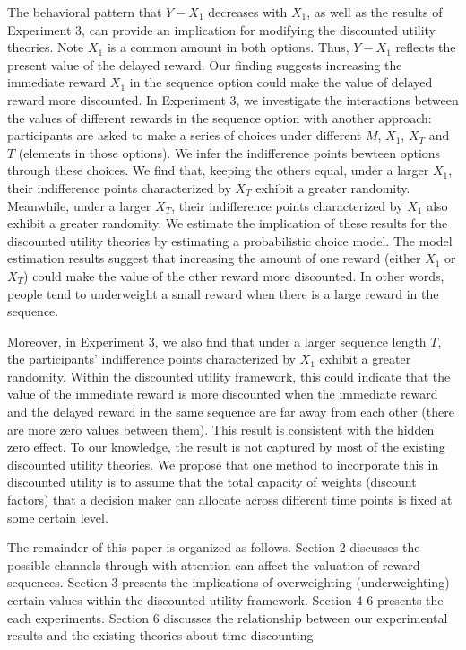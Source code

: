 \documentclass[
  12pt,
]{article}
\begin{document}
The behavioral pattern that \(Y-X_1\) decreases with \(X_1\), as well as
the results of Experiment 3, can provide an implication for modifying
the discounted utility theories. Note \(X_1\) is a common amount in both
options. Thus, \(Y-X_1\) reflects the present value of the delayed
reward. Our finding suggests increasing the immediate reward \(X_1\) in
the sequence option could make the value of delayed reward more
discounted. In Experiment 3, we investigate the interactions between the
values of different rewards in the sequence option with another
approach: participants are asked to make a series of choices under
different \(M\), \(X_1\), \(X_T\) and \(T\) (elements in those options).
We infer the indifference points bewteen options through these choices.
We find that, keeping the others equal, under a larger \(X_1\), their
indifference points characterized by \(X_T\) exhibit a greater
randomity. Meanwhile, under a larger \(X_T\), their indifference points
characterized by \(X_1\) also exhibit a greater randomity. We estimate
the implication of these results for the discounted utility theories by
estimating a probabilistic choice model. The model estimation results
suggest that increasing the amount of one reward (either \(X_1\) or
\(X_T\)) could make the value of the other reward more discounted. In
other words, people tend to underweight a small reward when there is a
large reward in the sequence.

Moreover, in Experiment 3, we also find that under a larger sequence
length \(T\), the participants' indifference points characterized by
\(X_1\) exhibit a greater randomity. Within the discounted utility
framework, this could indicate that the value of the immediate reward is
more discounted when the immediate reward and the delayed reward in the
same sequence are far away from each other (there are more zero values
between them). This result is consistent with the hidden zero effect. To
our knowledge, the result is not captured by most of the existing
discounted utility theories. We propose that one method to incorporate
this in discounted utility is to assume that the total capacity of
weights (discount factors) that a decision maker can allocate across
different time points is fixed at some certain level.

The remainder of this paper is organized as follows. Section 2 discusses
the possible channels through with attention can affect the valuation of
reward sequences. Section 3 presents the implications of overweighting
(underweighting) certain values within the discounted utility framework.
Section 4-6 presents the each experiments. Section 6 discusses the
relationship between our experimental results and the existing theories
about time discounting.
\end{document}
